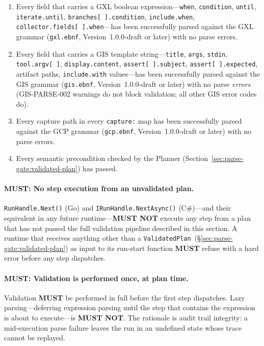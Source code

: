 \begin{enumerate}
  \item Every field that carries a GXL boolean expression---\texttt{when},
    \texttt{condition}, \texttt{until}, \texttt{iterate.until},
    \texttt{branches[\,].condition}, \texttt{include.when},
    \texttt{collector.fields[\,].when}---has been successfully parsed against
    the GXL grammar (\texttt{gxl.ebnf}, Version~1.0.0-draft or later) with no
    parse errors.

  \item Every field that carries a GIS template string---\texttt{title},
    \texttt{args}, \texttt{stdin}, \texttt{tool.argv[\,]},
    \texttt{display.content}, \texttt{assert[\,].subject},
    \texttt{assert[\,].expected}, artifact paths, \texttt{include.with}
    values---has been successfully parsed against the GIS grammar
    (\texttt{gis.ebnf}, Version~1.0.0-draft or later) with no parse
    \emph{errors} (GIS-PARSE-002 warnings do not block validation; all other
    GIS error codes do).

  \item Every capture path in every \texttt{capture:} map has been
    successfully parsed against the GCP grammar (\texttt{gcp.ebnf},
    Version~1.0.0-draft or later) with no parse errors.

  \item Every semantic precondition checked by the Planner
    (Section~\ref{sec:parse-gate:validated-plan}) has passed.
\end{enumerate}

\paragraph{MUST: No step execution from an unvalidated plan.}
\texttt{RunHandle.Next()} (Go) and \texttt{IRunHandle.NextAsync()} (C\#)---and
their equivalent in any future runtime---\textbf{MUST NOT} execute any step
from a plan that has not passed the full validation pipeline described in this
section.  A runtime that receives anything other than a
\texttt{ValidatedPlan}~(\S\ref{sec:parse-gate:validated-plan}) as input to its
run-start function \textbf{MUST} refuse with a hard error before any step
dispatches.

\paragraph{MUST: Validation is performed once, at plan time.}
Validation \textbf{MUST} be performed in full before the first step dispatches.
Lazy parsing---deferring expression parsing until the step that contains the
expression is about to execute---is \textbf{MUST NOT}.  The rationale is
audit trail integrity: a mid-execution parse failure leaves the run in an
undefined state whose trace cannot be replayed.

